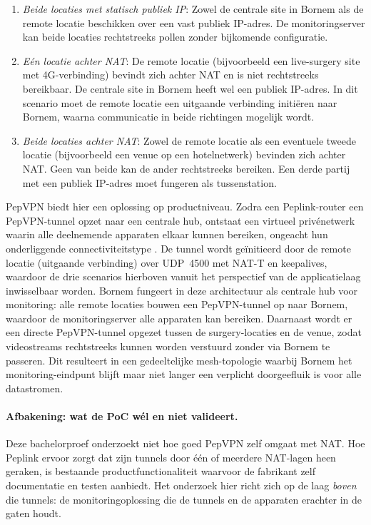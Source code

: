 \begin{enumerate}
\item \emph{Beide locaties met statisch publiek IP}: Zowel de centrale site in Bornem als de remote locatie beschikken over een vast publiek IP-adres. De monitoringserver kan beide locaties rechtstreeks pollen zonder bijkomende configuratie.

\item \emph{Eén locatie achter NAT}: De remote locatie (bijvoorbeeld een live-surgery site met 4G-verbinding) bevindt zich achter NAT en is niet rechtstreeks bereikbaar. De centrale site in Bornem heeft wel een publiek IP-adres. In dit scenario moet de remote locatie een uitgaande verbinding initiëren naar Bornem, waarna communicatie in beide richtingen mogelijk wordt.

\item \emph{Beide locaties achter NAT}: Zowel de remote locatie als een eventuele tweede locatie (bijvoorbeeld een venue op een hotelnetwerk) bevinden zich achter NAT. Geen van beide kan de ander rechtstreeks bereiken. Een derde partij met een publiek IP-adres moet fungeren als tussenstation.
\end{enumerate}

PepVPN biedt hier een oplossing op productniveau. Zodra een Peplink-router een PepVPN-tunnel opzet naar een centrale hub, ontstaat een virtueel privénetwerk waarin alle deelnemende apparaten elkaar kunnen bereiken, ongeacht hun onderliggende connectiviteitstype \autocite{Peplink2023}. De tunnel wordt geïnitieerd door de remote locatie (uitgaande verbinding) over UDP~4500 met NAT-T en keepalives, waardoor de drie scenarios hierboven vanuit het perspectief van de applicatielaag inwisselbaar worden. Bornem fungeert in deze architectuur als centrale hub voor monitoring: alle remote locaties bouwen een PepVPN-tunnel op naar Bornem, waardoor de monitoringserver alle apparaten kan bereiken. Daarnaast wordt er een directe PepVPN-tunnel opgezet tussen de surgery-locaties en de venue, zodat videostreams rechtstreeks kunnen worden verstuurd zonder via Bornem te passeren. Dit resulteert in een gedeeltelijke mesh-topologie waarbij Bornem het monitoring-eindpunt blijft maar niet langer een verplicht doorgeefluik is voor alle datastromen.

\paragraph{Afbakening: wat de PoC wél en niet valideert.} Deze bachelorproef onderzoekt niet hoe goed PepVPN zelf omgaat met NAT. Hoe Peplink ervoor zorgt dat zijn tunnels door één of meerdere NAT-lagen heen geraken, is bestaande productfunctionaliteit waarvoor de fabrikant zelf documentatie en testen aanbiedt. Het onderzoek hier richt zich op de laag \emph{boven} die tunnels: de monitoringoplossing die de tunnels en de apparaten erachter in de gaten houdt.

